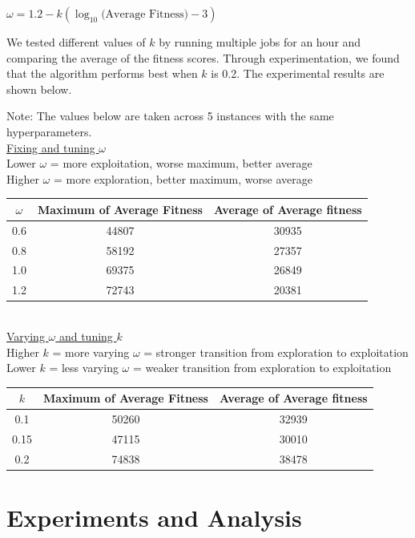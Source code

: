 \documentclass[12pt]{article}
\begin{document}
	\begin{center}
		$\omega = 1.2 - k(\log_{10}\text{(Average Fitness)} - 3)$
	\end{center}

	We tested different values of $k$ by running multiple jobs for an hour and comparing
 	the average of the fitness scores. Through experimentation, we found that the
	algorithm performs best when $k$ is 0.2. The experimental results are shown below.

	Note: The values below are taken across 5 instances with the same hyperparameters.\\

	\underline{Fixing and tuning $\omega$}\\
	Lower $\omega$ = more exploitation, worse maximum, better average\\
	Higher $\omega$ = more exploration, better maximum, worse average\\

	\begin{tabular}{ | c | c | c | }
		\hline
		$\omega$ & Maximum of Average Fitness & Average of Average fitness \\ \hline
		0.6 & 44807 & 30935 \\ \hline
		0.8 & 58192 & 27357 \\ \hline
		1.0 & 69375 & 26849 \\ \hline
		1.2 & 72743 & 20381 \\ \hline
	\end{tabular}\\[0.5em]

	\underline{Varying $\omega$ and tuning $k$}\\
	Higher $k$ = more varying $\omega$ = stronger transition from exploration to exploitation\\
	Lower $k$ = less varying $\omega$ = weaker transition from exploration to exploitation\\

	\begin{tabular}{ | c | c | c | }
		\hline
		$k$ & Maximum of Average Fitness & Average of Average fitness \\ \hline
		0.1 & 50260 & 32939 \\ \hline
		0.15 & 47115 & 30010 \\ \hline
		0.2 & 74838 & 38478 \\ \hline
	\end{tabular}

    \section{Experiments and Analysis}
\end{document}
